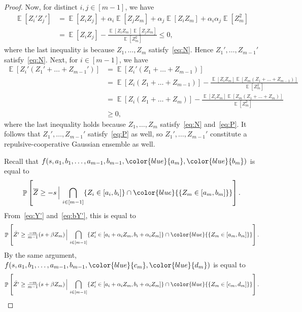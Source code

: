 \documentclass[12pt,english,reqno]{amsart}
\theoremstyle{plain}
\theoremstyle{remark}
\numberwithin{figure}{section}
\numberwithin{equation}{section}
\def\bZ{\overline{Z}}
\DeclareMathOperator{\Eb}{\mathbb{E}} %
\DeclareMathOperator{\Pb}{\mathbb{P}} %
\begin{document}
\begin{proof}
	Now, for distinct $i,j \in [m-1]$, we have
	\begin{align*}
		\Eb[Z_i' Z_j'] & = \Eb[Z_iZ_j] + \alpha_i \Eb[Z_j Z_m] + \alpha_j \Eb[Z_i Z_m] + \alpha_i \alpha_j \Eb[Z_m^2] \\
		               & = \Eb[Z_iZ_j] - \frac{\Eb[Z_i Z_m] \Eb[Z_j Z_m]}{\Eb[Z_m^2]} \leq 0,
	\end{align*}
	where the last inequality is because $Z_1,\dots, Z_m$ satisfy~\ref{eq:N}. Hence $Z_1',\dots, Z_{m-1}'$ satisfy~\ref{eq:N}. Next, for $i \in [m-1]$, we have
	\begin{align*}
		\Eb[Z_i'(Z_1'+\dots+Z_{m-1}')] & = \Eb[Z_i'(Z_1+\dots+Z_{m-1})]                                                             \\
		                               & = \Eb[Z_i(Z_1+\dots+Z_{m-1})] - \frac{\Eb[Z_iZ_m] \Eb[Z_m(Z_1+\dots+Z_{m-1})]}{\Eb[Z_m^2]} \\
		                               & = \Eb[Z_i(Z_1+\dots+Z_m)] - \frac{\Eb[Z_iZ_m] \Eb[Z_m(Z_1+\dots+Z_m)]}{\Eb[Z_m^2]}         \\
		                               & \geq 0,
	\end{align*}
	where the last inequality holds because $Z_1,\dots, Z_m$ satisfy~\ref{eq:N} and~\ref{eq:P}. It follows that $Z_1',\dots, Z_{m-1}'$ satisfy~\ref{eq:P} as well, so $Z_1',\dots, Z_{m-1}'$ constitute a repulsive-cooperative Gaussian ensemble as well.

	Recall that $f(s,a_1,b_1,\dots, a_{m-1}, b_{m-1}, {\color{blue}{a_m}}, {\color{blue}{b_m}})$ is equal to
	\begin{equation*}
		\Pb\left[ \bZ \geq -s \, \Big \vert \, \bigcap_{i \in [m-1]} \{Z_i \in [a_i,b_i]\} \cap {\color{blue}{\{Z_m \in [a_m,b_m]\} }} \right].
	\end{equation*}
	From~\eqref{eq:Y'} and~\eqref{eq:bY'}, this is equal to
	\begin{equation*}
		\Pb\left[ \bar{Z'} \geq \tfrac{-m}{m-1}(s+\beta Z_m) \, \Big \vert \, \bigcap_{i \in [m-1]} \{Z_i' \in [a_i+\alpha_i Z_m,b_i+\alpha_i Z_m]\} \cap {\color{blue}{\{Z_m \in [a_m,b_m]\} }} \right].
	\end{equation*}
	By the same argument, $f(s,a_1,b_1,\dots, a_{m-1}, b_{m-1}, {\color{blue}{c_m}}, {\color{blue}{d_m}})$ is equal to
	\begin{equation*}
		\Pb\left[ \bar{Z'} \geq \tfrac{-m}{m-1}(s+\beta Z_m) \, \Big \vert \, \bigcap_{i \in [m-1]} \{Z_i' \in [a_i+\alpha_i Z_m,b_i+\alpha_i Z_m]\} \cap {\color{blue}{\{Z_m \in [c_m,d_m]\} }} \right].
	\end{equation*}


\end{proof}
\end{document}
